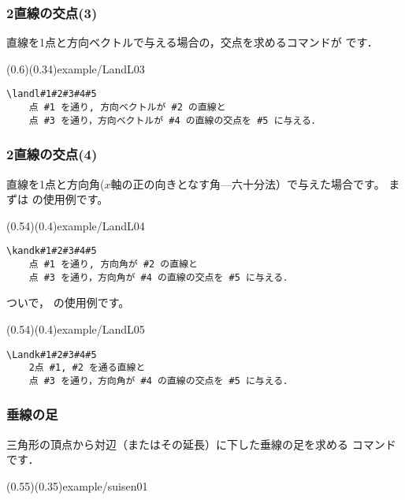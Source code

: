 \subsubsection{2直線の交点(3) \texorpdfstring{}{landl}}
直線を1点と方向ベクトルで与える場合の，交点を求めるコマンドが
 です．

(0.6)(0.34){example/LandL03}

\begin{boxnote}
\begin{verbatim}
\landl#1#2#3#4#5
    点 #1 を通り, 方向ベクトルが #2 の直線と
    点 #3 を通り，方向ベクトルが #4 の直線の交点を #5 に与える．
\end{verbatim}
\end{boxnote}

\subsubsection{2直線の交点(4) \texorpdfstring{}{Landk}}
直線を1点と方向角($x$軸の正の向きとなす角---六十分法）で与えた場合です。
まずは  の使用例です。

(0.54)(0.4){example/LandL04}

\begin{boxnote}
\begin{verbatim}
\kandk#1#2#3#4#5
    点 #1 を通り, 方向角が #2 の直線と
    点 #3 を通り，方向角が #4 の直線の交点を #5 に与える．
\end{verbatim}
\end{boxnote}

ついで， の使用例です。

(0.54)(0.4){example/LandL05}

\begin{boxnote}
\begin{verbatim}
\Landk#1#2#3#4#5
    2点 #1, #2 を通る直線と
    点 #3 を通り，方向角が #4 の直線の交点を #5 に与える．
\end{verbatim}
\end{boxnote}

\subsubsection{垂線の足}
三角形の頂点から対辺（またはその延長）に下した垂線の足を求める
コマンド  です．

(0.55)(0.35){example/suisen01}

